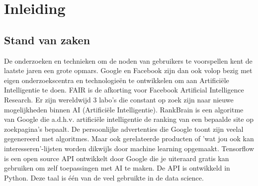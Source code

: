 
\chapter{Inleiding}
\label{ch:inleiding}




\section{Stand van zaken}
\label{sec:stand-van-zaken}



De onderzoeken en technieken om de noden van gebruikers te voorspellen kent de laatste jaren een grote opmars. Google en Facebook zijn dan ook volop bezig met eigen onderzoekscentra en technologieën te ontwikkelen om aan Artificiële Intelligentie te doen. FAIR is de afkorting voor Facebook Artificial Intelligence Research. Er zijn wereldwijd 3 labo's die constant op zoek zijn naar nieuwe mogelijkheden binnen AI (Artificiële Intelligentie). RankBrain is een algoritme van Google die a.d.h.v. artificiële intelligentie de ranking van een bepaalde site op zoekpagina's bepaalt.
De persoonlijke advertenties die Google toont zijn veelal gegenereerd met algoritmes.  Maar ook gerelateerde producten of 'wat jou ook kan interesseren'-lijsten worden dikwijls door machine learning opgemaakt. Tensorflow \autocite{tensorflow} is een open source API ontwikkelt door Google die je uiteraard gratis kan gebruiken om zelf toepassingen met AI te maken. De API is ontwikkeld in Python. Deze taal is één van de veel gebruikte in de data science\autocite{pythonMostPopular}.

